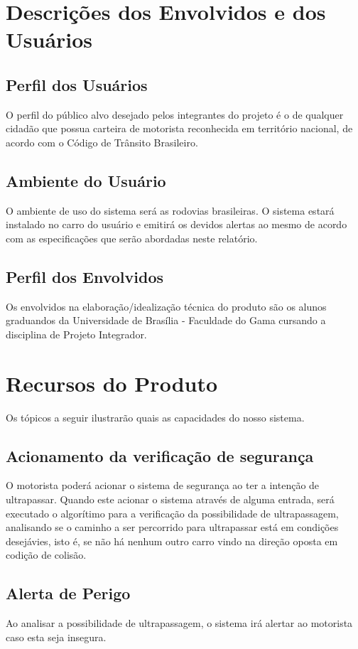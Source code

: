 \section{Descrições dos Envolvidos e dos Usuários}

\subsection{Perfil dos Usuários}
O perfil do público alvo desejado pelos integrantes do projeto é o de qualquer cidadão que possua carteira de motorista reconhecida em território nacional, de acordo com o Código de Trânsito Brasileiro\cite{ctb}.

\subsection{Ambiente do Usuário}
O ambiente de uso do sistema será as rodovias brasileiras. O sistema estará instalado no carro do usuário e emitirá os devidos alertas ao mesmo de acordo com as especificações que serão abordadas neste relatório.

\subsection{Perfil dos Envolvidos}
Os envolvidos na elaboração/idealização técnica do produto são os alunos graduandos da Universidade de Brasília - Faculdade do Gama cursando a disciplina de Projeto Integrador.

\section{Recursos do Produto}
Os tópicos a seguir ilustrarão quais as capacidades do nosso sistema.
\subsection{Acionamento da verificação de segurança}
O motorista poderá acionar o sistema de segurança ao ter a intenção de ultrapassar.
Quando este acionar o sistema através de alguma entrada, será executado o algorítimo para a verificação da possibilidade de
ultrapassagem, analisando se o caminho a ser percorrido para ultrapassar está em condições desejávies, isto é,
se não há nenhum outro carro vindo na direção oposta em codição de colisão.

\subsection{Alerta de Perigo}
Ao analisar a possibilidade de ultrapassagem, o sistema irá alertar ao motorista caso esta seja insegura.

